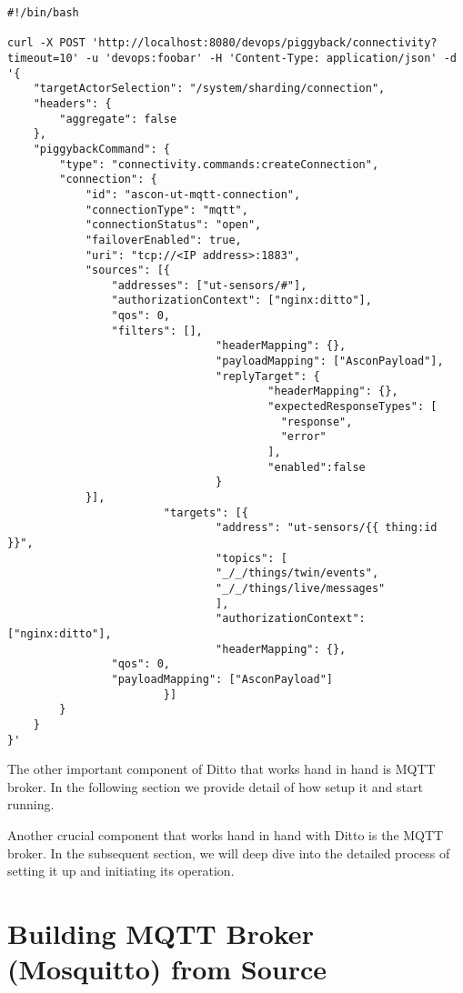\begin{lstlisting}[style=CStyle]
#!/bin/bash

curl -X POST 'http://localhost:8080/devops/piggyback/connectivity?timeout=10' -u 'devops:foobar' -H 'Content-Type: application/json' -d '{
    "targetActorSelection": "/system/sharding/connection",
    "headers": {
        "aggregate": false
    },
    "piggybackCommand": {
        "type": "connectivity.commands:createConnection",
        "connection": {
            "id": "ascon-ut-mqtt-connection",
            "connectionType": "mqtt",
            "connectionStatus": "open",
            "failoverEnabled": true,
            "uri": "tcp://<IP address>:1883",
            "sources": [{
                "addresses": ["ut-sensors/#"],
                "authorizationContext": ["nginx:ditto"],
                "qos": 0,
                "filters": [],
                                "headerMapping": {},
                                "payloadMapping": ["AsconPayload"],
                                "replyTarget": {
                                        "headerMapping": {},
                                        "expectedResponseTypes": [
                                          "response",
                                          "error"
                                        ],
                                        "enabled":false
                                }
            }],
                        "targets": [{
                                "address": "ut-sensors/{{ thing:id }}",
                                "topics": [
                                "_/_/things/twin/events",
                                "_/_/things/live/messages"
                                ],
                                "authorizationContext": ["nginx:ditto"],
                                "headerMapping": {},
                "qos": 0,
                "payloadMapping": ["AsconPayload"]
                        }]
        }
    }
}'
\end{lstlisting}


The other important component of Ditto that works hand in hand is MQTT broker. In the following section we provide detail of how setup it and start running. 

Another crucial component that works hand in hand with Ditto is the MQTT broker. In the subsequent section, we will deep dive into the detailed process of setting it up and initiating its operation.

\section{Building MQTT Broker (Mosquitto) from Source}

